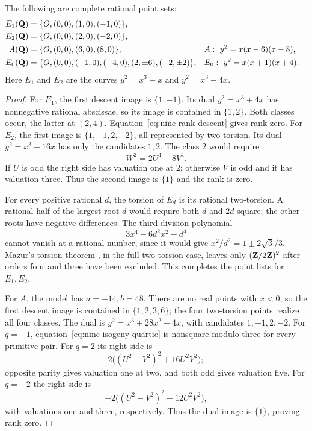 \begin{lemma}\label{lem:nine-small-curves}
The following are complete rational point sets:
\begin{align*}
 E_1(\mathbf Q)&=\{O,(0,0),(1,0),(-1,0)\},\\
 E_2(\mathbf Q)&=\{O,(0,0),(2,0),(-2,0)\},\\
 A(\mathbf Q)&=\{O,(0,0),(6,0),(8,0)\},
   &&A:\ y^2=x(x-6)(x-8),\\
 E_0(\mathbf Q)&=\{O,(0,0),(-1,0),(-4,0),(2,\pm6),(-2,\pm2)\},
   &&E_0:\ y^2=x(x+1)(x+4).
\end{align*}
Here $E_1$ and $E_2$ are the curves $y^2=x^3-x$ and $y^2=x^3-4x$.
\end{lemma}
\begin{proof}
For $E_1$, the first descent image is $\{1,-1\}$.
Its dual $y^2=x^3+4x$ has nonnegative rational abscissae, so its image
is contained in $\{1,2\}$.  Both classes occur, the latter at $(2,4)$.
Equation~\eqref{eq:nine-rank-descent} gives rank zero.
For $E_2$, the first image is $\{1,-1,2,-2\}$, all represented by
two-torsion.  Its dual $y^2=x^3+16x$ has only the candidates $1,2$.
The class $2$ would require
\[
 W^2=2U^4+8V^4.
\]
If $U$ is odd the right side has valuation one at $2$; otherwise $V$
is odd and it has valuation three.  Thus the second image is
$\{1\}$ and the rank is zero.

For every positive rational $d$, the torsion of $E_d$ is its rational
two-torsion.  A rational half of the largest root $d$ would require
both $d$ and $2d$ square; the other roots have negative differences.
The third-division polynomial
\[
 3x^4-6d^2x^2-d^4
\]
cannot vanish at a rational number, since it would give
$x^2/d^2=1\pm2\sqrt3/3$.  Mazur's torsion theorem
\cite{mazur1977}, in the full-two-torsion case, leaves only
$(\mathbf Z/2\mathbf Z)^2$ after orders four and three have been excluded.
This completes the point lists for $E_1,E_2$.

For $A$, the model has $a=-14,b=48$.  There are no real points with
$x<0$, so the first descent image is contained in $\{1,2,3,6\}$;
the four two-torsion points realize all four classes.  The dual is
$y^2=x^3+28x^2+4x$, with candidates $1,-1,2,-2$.
For $q=-1$, equation~\eqref{eq:nine-isogeny-quartic} is nonsquare
modulo three for every primitive pair.  For $q=2$ its right side is
\[
 2\bigl((U^2-V^2)^2+16U^2V^2\bigr);
\]
opposite parity gives valuation one at two, and both odd gives
valuation five.  For $q=-2$ the right side is
\[
 -2\bigl((U^2-V^2)^2-12U^2V^2\bigr),
\]
with valuations one and three, respectively.  Thus the dual image
is $\{1\}$, proving rank zero.


\end{proof}
